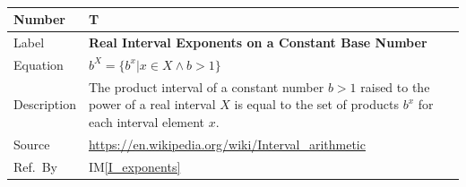 \documentclass[12pt]{article}
\newcommand{\colAwidth}{0.13\textwidth}
\newcommand{\colBwidth}{0.82\textwidth}
\newcounter{theorynum} %
\newcommand{\iref}[1]{IM\ref{#1}}
\begin{document}

~\newline

\noindent
\begin{minipage}{\textwidth}
	\renewcommand*{\arraystretch}{1.5}
	\begin{tabular}{| p{\colAwidth} | p{\colBwidth}|}
		\hline
		\rowcolor[gray]{0.9}
		Number& T{theorynum}\thetheorynum 
		\label{T_exponents}\\
		\hline
		Label&\bf Real Interval Exponents on a Constant Base Number\\
		\hline
		Equation&  $b^X = \{b^x | x \in X \wedge b > 1\}$\\
		\hline
		Description & The product interval of a constant number $b > 1$ raised 
		to the power of a real interval $X$ is equal to the set of products 
		$b^x$ for each interval element $x$.\\
		\hline
		Source & \url{https://en.wikipedia.org/wiki/Interval_arithmetic}\\
		\hline
		Ref.\ By & \iref{I_exponents}\\
		\hline
	\end{tabular}
\end{minipage}\\

~\newline
\end{document}
